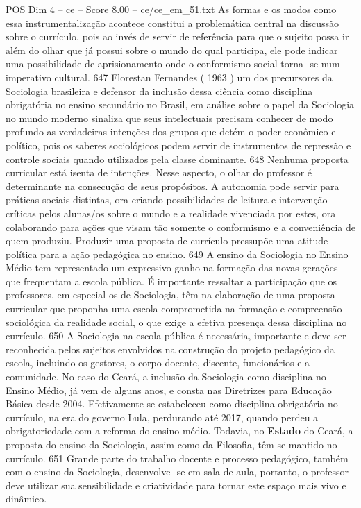 \begin{textsample}{POS Dim 4 – ce – Score 8.00 – ce/ce\_em\_51.txt}
As formas e os modos como essa instrumentalização acontece constitui a problemática central na discussão sobre o currículo, pois ao invés de servir de referência para que o sujeito possa ir além do olhar que já possui sobre o mundo do qual participa, ele pode indicar uma possibilidade de aprisionamento onde o conformismo social torna -se num imperativo cultural. 647 Florestan Fernandes ( 1963 ) um dos precursores da Sociologia brasileira e defensor da inclusão dessa ciência como disciplina obrigatória no ensino secundário no Brasil, em análise sobre o papel da Sociologia no mundo moderno sinaliza que seus intelectuais precisam conhecer de modo profundo as verdadeiras intenções dos grupos que detém o poder econômico e político, pois os saberes sociológicos podem servir de instrumentos de repressão e controle sociais quando utilizados pela classe dominante. 648 Nenhuma proposta curricular está isenta de intenções.
Nesse aspecto, o olhar do professor é determinante na consecução de seus propósitos.
A autonomia pode servir para práticas sociais distintas, ora criando possibilidades de leitura e intervenção críticas pelos alunas/os sobre o mundo e a realidade vivenciada por estes, ora colaborando para ações que visam tão somente o conformismo e a conveniência de quem produziu.
Produzir uma proposta de currículo pressupõe uma atitude política para a ação pedagógica no ensino. 649 A ensino da Sociologia no Ensino Médio tem representado um expressivo ganho na formação das novas gerações que frequentam a escola pública.
É importante ressaltar a participação que os professores, em especial os de Sociologia, têm na elaboração de uma proposta curricular que proponha uma escola comprometida na formação e compreensão sociológica da realidade social, o que exige a efetiva presença dessa disciplina no currículo. 650 A Sociologia na escola pública é necessária, importante e deve ser reconhecida pelos sujeitos envolvidos na construção do projeto pedagógico da escola, incluindo os gestores, o corpo docente, discente, funcionários e a comunidade.
No caso do Ceará, a inclusão da Sociologia como disciplina no Ensino Médio, já vem de alguns anos, e consta nas Diretrizes para Educação Básica desde 2004.
Efetivamente se estabeleceu como disciplina obrigatória no currículo, na era do governo Lula, perdurando até 2017, quando perdeu a obrigatoriedade com a reforma do ensino médio.
Todavia, no \textbf{Estado} do Ceará, a proposta do ensino da Sociologia, assim como da Filosofia, têm se mantido no currículo. 651 Grande parte do trabalho docente e processo pedagógico, também com o ensino da Sociologia, desenvolve -se em sala de aula, portanto, o professor deve utilizar sua sensibilidade e criatividade para tornar este espaço mais vivo e dinâmico.

\end{textsample}
